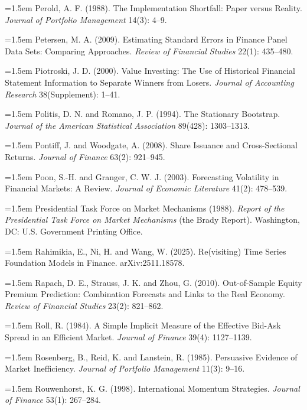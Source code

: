 \hangindent=1.5em Perold, A. F. (1988). The Implementation Shortfall: Paper versus Reality. \emph{Journal of Portfolio Management} 14(3): 4--9.

\hangindent=1.5em Petersen, M. A. (2009). Estimating Standard Errors in Finance Panel Data Sets: Comparing Approaches. \emph{Review of Financial Studies} 22(1): 435--480.

\hangindent=1.5em Piotroski, J. D. (2000). Value Investing: The Use of Historical Financial Statement Information to Separate Winners from Losers. \emph{Journal of Accounting Research} 38(Supplement): 1--41.

\hangindent=1.5em Politis, D. N. and Romano, J. P. (1994). The Stationary Bootstrap. \emph{Journal of the American Statistical Association} 89(428): 1303--1313.

\hangindent=1.5em Pontiff, J. and Woodgate, A. (2008). Share Issuance and Cross-Sectional Returns. \emph{Journal of Finance} 63(2): 921--945.

\hangindent=1.5em Poon, S.-H. and Granger, C. W. J. (2003). Forecasting Volatility in Financial Markets: A Review. \emph{Journal of Economic Literature} 41(2): 478--539.

\hangindent=1.5em Presidential Task Force on Market Mechanisms (1988). \emph{Report of the Presidential Task Force on Market Mechanisms} (the Brady Report). Washington, DC: U.S. Government Printing Office.

\hangindent=1.5em Rahimikia, E., Ni, H. and Wang, W. (2025). Re(visiting) Time Series Foundation Models in Finance. arXiv:2511.18578.

\hangindent=1.5em Rapach, D. E., Strauss, J. K. and Zhou, G. (2010). Out-of-Sample Equity Premium Prediction: Combination Forecasts and Links to the Real Economy. \emph{Review of Financial Studies} 23(2): 821--862.

\hangindent=1.5em Roll, R. (1984). A Simple Implicit Measure of the Effective Bid-Ask Spread in an Efficient Market. \emph{Journal of Finance} 39(4): 1127--1139.

\hangindent=1.5em Rosenberg, B., Reid, K. and Lanstein, R. (1985). Persuasive Evidence of Market Inefficiency. \emph{Journal of Portfolio Management} 11(3): 9--16.

\hangindent=1.5em Rouwenhorst, K. G. (1998). International Momentum Strategies. \emph{Journal of Finance} 53(1): 267--284.

